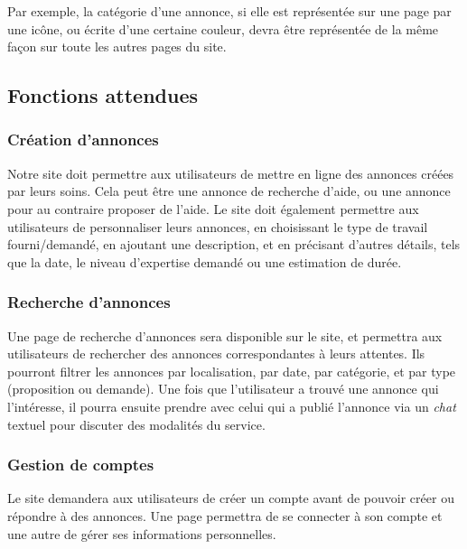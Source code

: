 \documentclass[a4paper,11pt]{article}
\begin{document}
Par exemple, la catégorie d'une annonce, si elle est représentée sur une page par une icône, ou écrite d'une certaine couleur, devra être représentée de la même façon sur toute les autres pages du site.



\subsection{Fonctions attendues}

\subsubsection{Création d’annonces}

Notre site doit permettre aux utilisateurs de mettre en ligne des annonces créées par leurs soins. Cela
peut être une annonce de recherche d’aide, ou une annonce pour au contraire proposer de l’aide. Le
site doit également permettre aux utilisateurs de personnaliser leurs annonces, en choisissant le type
de travail fourni/demandé, en ajoutant une description, et en précisant d’autres détails, tels que la date, le
niveau d’expertise demandé ou une estimation de durée.\\

\subsubsection{Recherche d’annonces}

Une page de recherche d’annonces sera disponible sur le site, et permettra aux utilisateurs de
rechercher des annonces correspondantes à leurs attentes. Ils pourront filtrer les annonces par
localisation, par date, par catégorie, et par type (proposition ou demande). Une fois que l’utilisateur
a trouvé une annonce qui l'intéresse, il pourra ensuite prendre avec celui qui a
publié l’annonce via un \textit{chat} textuel pour discuter des modalités du service.\\

\subsubsection{Gestion de comptes}

Le site demandera aux utilisateurs de créer un compte avant de pouvoir créer ou répondre à des
annonces. Une page permettra de se connecter à son compte et une autre de gérer ses informations
personnelles.\\
\end{document}
